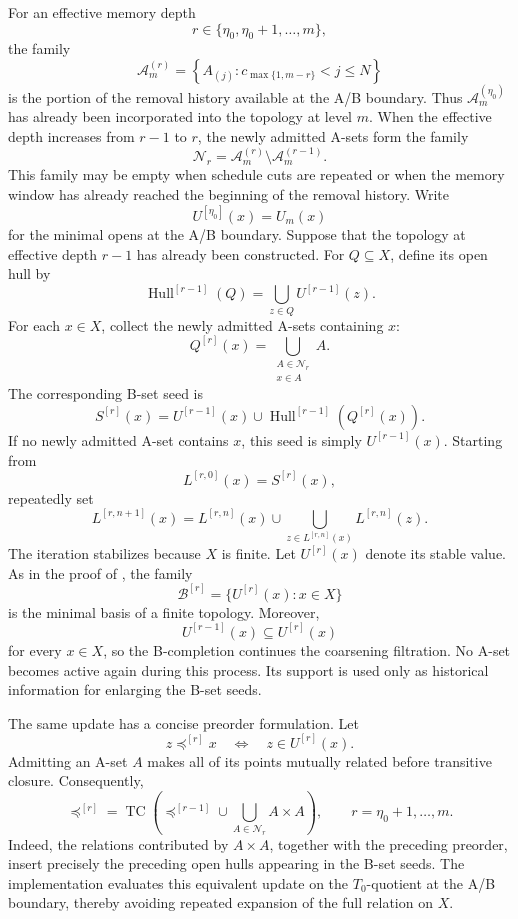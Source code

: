 \documentclass[a4paper,11pt]{article}
\theoremstyle{definition}
\theoremstyle{remark}
\begin{document}
For an effective memory depth
$$
r\in\{\eta_0,\eta_0+1,\ldots,m\},
$$
the family
$$
\mathcal A_m^{(r)} = \left\{A_{(j)}\colon c_{\max\{1,m-r\}}<j\leq N\right\}
$$
is the portion of the removal history available at the A/B boundary. Thus $\mathcal A_m^{(\eta_0)}$ has already been incorporated into the topology at level $m$. When the effective depth increases from $r-1$ to $r$, the newly admitted A-sets form the family
$$
\mathcal N_r = \mathcal A_m^{(r)}\setminus \mathcal A_m^{(r-1)}.
$$
This family may be empty when schedule cuts are repeated or when the memory window has already reached the beginning of the removal history. Write
$$
U^{[\eta_0]}(x) = U_m(x)
$$
for the minimal opens at the A/B boundary. Suppose that the topology at effective depth $r-1$ has already been constructed. For $Q\subseteq X$, define its open hull by
$$
\operatorname{Hull}^{[r-1]}(Q) = \bigcup_{z\in Q}U^{[r-1]}(z).
$$
For each $x\in X$, collect the newly admitted A-sets containing $x$:
$$
Q^{[r]}(x) = \bigcup_{\substack{A\in\mathcal N_r\\x\in A}}A.
$$
The corresponding B-set seed is
$$
S^{[r]}(x) = U^{[r-1]}(x)\cup \operatorname{Hull}^{[r-1]}\!\left(Q^{[r]}(x)\right).
$$
If no newly admitted A-set contains $x$, this seed is simply $U^{[r-1]}(x)$. Starting from
$$
L^{[r,0]}(x)=S^{[r]}(x),
$$
repeatedly set
$$
L^{[r,n+1]}(x) = L^{[r,n]}(x)\cup \bigcup_{z\in L^{[r,n]}(x)}L^{[r,n]}(z).
$$
The iteration stabilizes because $X$ is finite. Let $U^{[r]}(x)$ denote its stable value. As in the proof of , the family
$$
\mathcal B^{[r]} = \{U^{[r]}(x)\colon x\in X\}
$$
is the minimal basis of a finite topology. Moreover,
$$
U^{[r-1]}(x)\subseteq U^{[r]}(x)
$$
for every $x\in X$, so the B-completion continues the coarsening filtration. No A-set becomes active again during this process. Its support is used only as historical information for enlarging the B-set seeds.

The same update has a concise preorder formulation. Let
$$
z\preceq^{[r]}x\quad\Longleftrightarrow\quad z\in U^{[r]}(x).
$$
Admitting an A-set $A$ makes all of its points mutually related before transitive closure. Consequently,
$$
\boxed{
\preceq^{[r]} = \operatorname{TC}\!\left(\preceq^{[r-1]}\cup \bigcup_{A\in\mathcal N_r}A\times A\right),\qquad r=\eta_0+1,\ldots,m.
}
$$
Indeed, the relations contributed by $A\times A$, together with the preceding preorder, insert precisely the preceding open hulls appearing in the B-set seeds. The implementation evaluates this equivalent update on the $T_0$-quotient at the A/B boundary, thereby avoiding repeated expansion of the full relation on $X$.
\end{document}
